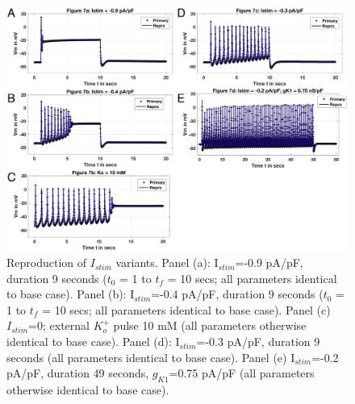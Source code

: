 \documentclass[fleqn,10pt]{physiome}
\begin{document}
\begin{figure}[ht]\centering
\centering
\includegraphics[scale=0.35]{./pics/sig2_assby-01}
\caption{Reproduction of $I_{stim}$ variants. Panel (a): I$_{stim}$=-0.9 pA/pF, duration 9 seconds ($t_0$ = 1 to $t_f$ = 10 secs; all parameters identical to base case). Panel (b): I$_{stim}$=-0.4 pA/pF, duration 9 seconds  ($t_0$ = 1 to $t_f$ = 10 secs; all parameters identical to base case). Panel (c) $I_{stim}$=0; external $K^+_o$ pulse 10 mM (all parameters otherwise identical to base case). Panel (d):  I$_{stim}$=-0.3 pA/pF, duration 9 seconds (all parameters identical to base case).  Panel (e) I$_{stim}$=-0.2 pA/pF, duration 49 seconds, $g_{K1}$=0.75 pA/pF (all parameters otherwise identical to base case).}
\label{fig:variation}
\end{figure}
\end{document}
